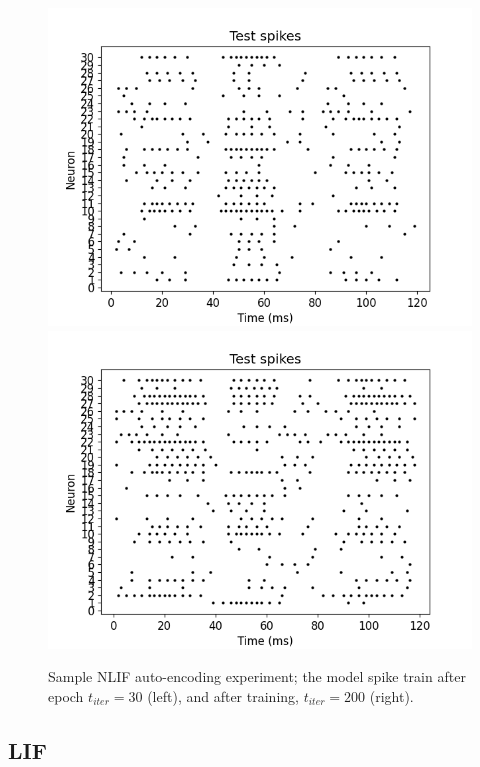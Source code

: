 \documentclass[mphil,deptreport,ianc]{infthesis} %
\begin{document}
\begin{figure}[!h]
    \centering
    \includegraphics[width=0.49\columnwidth]{figures/Supplementary/gating/NLIF/AutoEncoding/01-04_16-42-46-568/test_plot_spikes_train_iter_0_NLIF_24.png}
    \includegraphics[width=0.49\columnwidth]{figures/Supplementary/gating/NLIF/AutoEncoding/01-04_16-42-46-568/test_plot_spikes_train_iter_199_NLIF_24.png}
    \caption{Sample NLIF auto-encoding experiment; the model spike train after epoch $t_{iter}=30$ (left), and after training, $t_{iter}=200$ (right).}
    \label{fig:NLIF_AE_1_readouts_t_i_30_and_200}
\end{figure}

\FloatBarrier


\subsection*{LIF}
\end{document}

